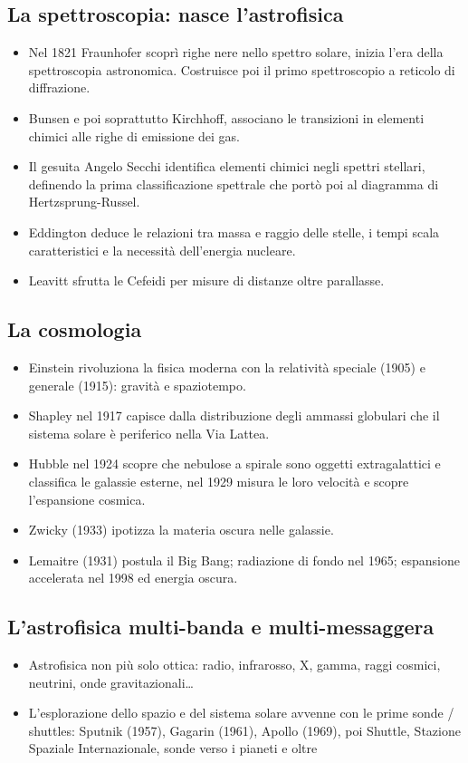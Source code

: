 \documentclass[a4paper, oneside]{book}
\begin{document}
\subsection{La spettroscopia: nasce l’astrofisica}
\begin{itemize}
    \item Nel 1821 Fraunhofer scoprì righe nere nello spettro solare,
inizia l’era della spettroscopia astronomica. Costruisce poi il
primo spettroscopio a reticolo di diffrazione.
\item  Bunsen e poi soprattutto Kirchhoff, associano le transizioni in
elementi chimici alle righe di emissione dei gas.
\item Il gesuita Angelo Secchi identifica elementi chimici negli spettri
stellari, definendo la prima classificazione spettrale che portò
poi al diagramma di Hertzsprung-Russel.
\item  Eddington deduce le relazioni tra massa e raggio delle stelle, i
tempi scala caratteristici e la necessità dell'energia nucleare.
\item  Leavitt sfrutta le Cefeidi per misure di distanze oltre parallasse.
\end{itemize}

\subsection{La cosmologia}
\begin{itemize}
    \item Einstein rivoluziona la fisica moderna con la relatività
speciale (1905) e generale (1915): gravità e spaziotempo.
\item  Shapley nel 1917 capisce dalla distribuzione degli ammassi
globulari che il sistema solare è periferico nella Via Lattea.
\item Hubble nel 1924 scopre che nebulose a spirale sono oggetti
extragalattici e classifica le galassie esterne, nel 1929
misura le loro velocità e scopre l’espansione cosmica.
\item Zwicky (1933) ipotizza la materia oscura nelle galassie.
\item Lemaitre (1931) postula il Big Bang; radiazione di fondo nel
1965; espansione accelerata nel 1998 ed energia oscura.
\end{itemize}

\subsection{L’astrofisica multi-banda e multi-messaggera}
\begin{itemize}
    \item Astrofisica non più solo ottica: radio, infrarosso, X, gamma,
raggi cosmici, neutrini, onde gravitazionali…

\item L’esplorazione dello spazio e del sistema solare avvenne con le prime 
sonde / shuttles: Sputnik (1957), Gagarin (1961), Apollo (1969), poi Shuttle,
Stazione Spaziale Internazionale, sonde verso i pianeti e oltre
\end{itemize}
\end{document}
